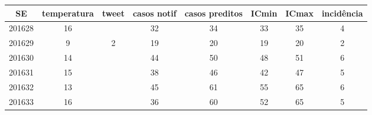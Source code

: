 \begin{tabular}{c|ccccccc}
  \hline
SE & temperatura & tweet & casos notif & casos preditos & ICmin & ICmax & incidência \\ 
  \hline
201628 & 16 &  & 32 & 34 & 33 & 35 & 4 \\ 
  201629 & 9 & 2 & 19 & 20 & 19 & 20 & 2 \\ 
  201630 & 14 &  & 44 & 50 & 48 & 51 & 6 \\ 
  201631 & 15 &  & 38 & 46 & 42 & 47 & 5 \\ 
  201632 & 13 &  & 45 & 61 & 55 & 65 & 6 \\ 
  201633 & 16 &  & 36 & 60 & 52 & 65 & 5 \\ 
   \hline
\end{tabular}
